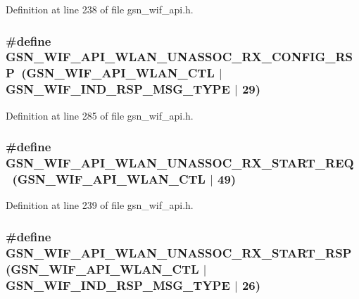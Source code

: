Definition at line 238 of file gsn\_\-wif\_\-api.h.

\hypertarget{a00606_a8766e85ca051694ef429be0992bcb5a5}{
\subsubsection[{GSN\_\-WIF\_\-API\_\-WLAN\_\-UNASSOC\_\-RX\_\-CONFIG\_\-RSP}]{\setlength{\rightskip}{0pt plus 5cm}\#define GSN\_\-WIF\_\-API\_\-WLAN\_\-UNASSOC\_\-RX\_\-CONFIG\_\-RSP~(GSN\_\-WIF\_\-API\_\-WLAN\_\-CTL $|$ GSN\_\-WIF\_\-IND\_\-RSP\_\-MSG\_\-TYPE $|$ 29)}}
\label{a00606_a8766e85ca051694ef429be0992bcb5a5}


Definition at line 285 of file gsn\_\-wif\_\-api.h.

\hypertarget{a00606_af768a3727f101af4d6dbee040a9df622}{
\subsubsection[{GSN\_\-WIF\_\-API\_\-WLAN\_\-UNASSOC\_\-RX\_\-START\_\-REQ}]{\setlength{\rightskip}{0pt plus 5cm}\#define GSN\_\-WIF\_\-API\_\-WLAN\_\-UNASSOC\_\-RX\_\-START\_\-REQ~(GSN\_\-WIF\_\-API\_\-WLAN\_\-CTL $|$ 49)}}
\label{a00606_af768a3727f101af4d6dbee040a9df622}


Definition at line 239 of file gsn\_\-wif\_\-api.h.

\hypertarget{a00606_ac189a3913a0937bae3c8d51279d222d8}{
\subsubsection[{GSN\_\-WIF\_\-API\_\-WLAN\_\-UNASSOC\_\-RX\_\-START\_\-RSP}]{\setlength{\rightskip}{0pt plus 5cm}\#define GSN\_\-WIF\_\-API\_\-WLAN\_\-UNASSOC\_\-RX\_\-START\_\-RSP~(GSN\_\-WIF\_\-API\_\-WLAN\_\-CTL $|$ GSN\_\-WIF\_\-IND\_\-RSP\_\-MSG\_\-TYPE $|$ 26)}}
\label{a00606_ac189a3913a0937bae3c8d51279d222d8}


